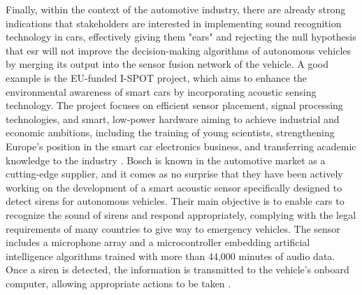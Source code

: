 Finally, within the context of the automotive industry, there are already strong indications that stakeholders are interested in implementing sound recognition technology in cars, effectively giving them "ears" and rejecting the null hypothesis that \gls{esr} will not improve the decision-making
algorithms of autonomous vehicles by merging its output into the sensor fusion network of the vehicle. A good example is the EU-funded I-SPOT project, which aims to enhance the environmental awareness of smart cars by incorporating acoustic sensing technology. The project focuses on efficient sensor placement, signal processing technologies, and smart, low-power hardware aiming to achieve industrial and economic ambitions, including the training of young scientists, strengthening Europe's position in the smart car electronics business, and transferring academic knowledge to the industry \cite{ISPOT2020}. Bosch is known in the automotive market as a cutting-edge supplier, and it comes as no surprise that they have been actively working on the development of a smart acoustic sensor specifically designed to detect sirens for autonomous vehicles. Their main objective is to enable cars to recognize the sound of sirens and respond appropriately, complying with the legal requirements of many countries to give way to emergency vehicles. The sensor includes a microphone array and a microcontroller embedding artificial intelligence algorithms trained with more than 44,000 minutes of audio data. Once a siren is detected, the information is transmitted to the vehicle's onboard computer, allowing appropriate actions to be taken \cite{BOSCH2024}.

